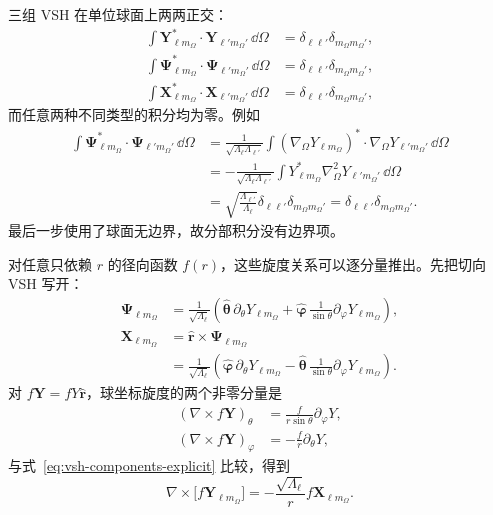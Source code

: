 三组 VSH 在单位球面上两两正交：
\begin{align}
\int\bm Y_{\ell m_{\Omega}}^*\cdot\bm Y_{\ell' m_{\Omega}'}\,\dd\Omega
&=\delta_{\ell\ell'}\delta_{m_{\Omega}m_{\Omega}'},
\\
\int\bm\Psi_{\ell m_{\Omega}}^*\cdot\bm\Psi_{\ell' m_{\Omega}'}\,\dd\Omega
&=\delta_{\ell\ell'}\delta_{m_{\Omega}m_{\Omega}'},
\\
\int\bm X_{\ell m_{\Omega}}^*\cdot\bm X_{\ell' m_{\Omega}'}\,\dd\Omega
&=\delta_{\ell\ell'}\delta_{m_{\Omega}m_{\Omega}'},
\label{eq:vsh-orthogonality}
\end{align}
而任意两种不同类型的积分均为零。例如
\begin{align}
\int\bm\Psi_{\ell m_{\Omega}}^*\cdot\bm\Psi_{\ell' m_{\Omega}'}\,\dd\Omega
&=\frac{1}{\sqrt{\Lambda_\ell\Lambda_{\ell'}}}
\int(\nabla_\Omega Y_{\ell m_{\Omega}})^*
\cdot\nabla_\Omega Y_{\ell' m_{\Omega}'}\,\dd\Omega
\\
&=-\frac{1}{\sqrt{\Lambda_\ell\Lambda_{\ell'}}}
\int Y_{\ell m_{\Omega}}^*\nabla_\Omega^2Y_{\ell' m_{\Omega}'}\,\dd\Omega
\\
&=\sqrt{\frac{\Lambda_{\ell'}}{\Lambda_\ell}}
\delta_{\ell\ell'}\delta_{m_{\Omega}m_{\Omega}'}
=\delta_{\ell\ell'}\delta_{m_{\Omega}m_{\Omega}'}.
\end{align}
最后一步使用了球面无边界，故分部积分没有边界项。

对任意只依赖 $r$ 的径向函数 $f(r)$，这些旋度关系可以逐分量推出。先把切向 VSH 写开：
\begin{align}
\bm\Psi_{\ell m_\Omega}
&=\frac{1}{\sqrt{\Lambda_\ell}}
\left(
\hat{\bm\theta}\,\partial_\theta Y_{\ell m_\Omega}
+\hat{\bm\varphi}\,\frac{1}{\sin\theta}\partial_\varphi Y_{\ell m_\Omega}
\right),\\
\bm X_{\ell m_\Omega}
&=\hat{\bm r}\times\bm\Psi_{\ell m_\Omega}\\
&=\frac{1}{\sqrt{\Lambda_\ell}}
\left(
\hat{\bm\varphi}\,\partial_\theta Y_{\ell m_\Omega}
-\hat{\bm\theta}\,\frac{1}{\sin\theta}\partial_\varphi Y_{\ell m_\Omega}
\right).
\label{eq:vsh-components-explicit}
\end{align}
对 $f\bm Y=fY\hat{\bm r}$，球坐标旋度的两个非零分量是
\begin{align}
(\nabla\times f\bm Y)_\theta
&=\frac{f}{r\sin\theta}\partial_\varphi Y,\\
(\nabla\times f\bm Y)_\varphi
&=-\frac{f}{r}\partial_\theta Y,
\end{align}
与式~\eqref{eq:vsh-components-explicit} 比较，得到
\begin{equation}
\nabla\times\bigl[f\bm Y_{\ell m_\Omega}\bigr]
=-\frac{\sqrt{\Lambda_\ell}}{r}f\bm X_{\ell m_\Omega}.
\end{equation}


